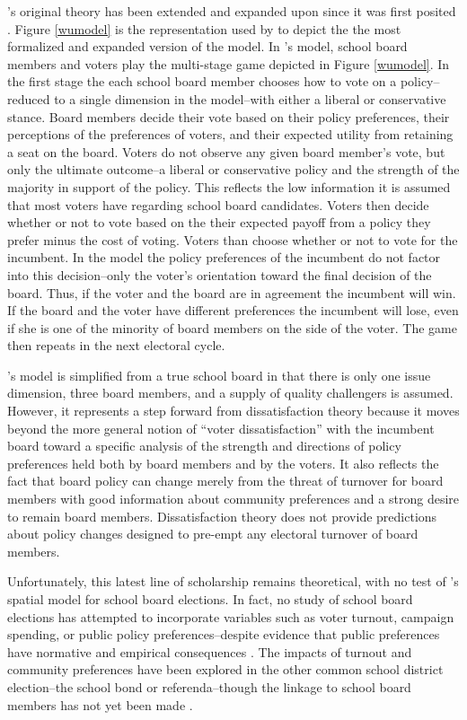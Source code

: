 \citet{RefWorks:336}'s original theory has been extended and expanded upon since 
it was first posited \citep{RefWorks:339,RefWorks:340,RefWorks:243}. Figure \ref{wumodel} 
is the representation used by \citet{RefWorks:243} to depict the the most 
formalized and expanded version of the model. In \citet{RefWorks:243}'s model, 
school board members and voters play the multi-stage game depicted in Figure 
\ref{wumodel}. In the first stage the each school board member chooses how to vote 
on a policy--reduced to a single dimension in the model--with either a liberal or 
conservative stance. Board members decide their vote based on their policy preferences, 
their perceptions of the preferences of voters, and their expected utility from 
retaining a seat on the board. Voters do not observe any given board member's vote, 
but only the ultimate outcome--a liberal or conservative policy and the strength 
of the majority in support of the policy. This reflects the low information it 
is assumed that most voters have regarding school board candidates. Voters then 
decide whether or not to vote based on the their expected payoff from a policy 
they prefer minus the cost of voting. Voters than choose whether or not to vote 
for the incumbent. In the model the policy preferences of the incumbent do not 
factor into this decision--only the voter's orientation toward the final decision 
of the board. Thus, if the voter and the board are in agreement the incumbent will 
win. If the board and the voter have different preferences the incumbent will 
lose, even if she is one of the minority of board members on the side of the 
voter. The game then repeats in the next electoral cycle. 

\citet{RefWorks:243}'s model is simplified from a true school board in that there 
is only one issue dimension, three board members, and a supply of quality 
challengers is assumed. However, it represents a step forward from dissatisfaction 
theory because it moves beyond the more general notion of ``voter dissatisfaction'' 
with the incumbent board toward a specific analysis of the strength and directions 
of policy preferences held both by board members and by the voters. It also reflects 
the fact that board policy can change merely from the threat of turnover for board 
members with good information about community preferences and a strong desire to 
remain board members. Dissatisfaction theory does not provide predictions about 
policy changes designed to pre-empt any electoral turnover of board members.

Unfortunately, this latest line of scholarship remains theoretical, with no test 
of \citet{RefWorks:243}'s spatial model for school board elections. In fact, no 
study of school board elections has attempted to incorporate variables such as 
voter turnout, campaign spending, or public policy preferences--despite evidence 
that public preferences have normative and empirical consequences 
\citep{RefWorks:228}.  The impacts of turnout and community preferences have 
been explored in the other common school district election--the school bond or 
referenda--though the linkage to school board members has not yet been made 
\citep{RefWorks:342, RefWorks:343}.


